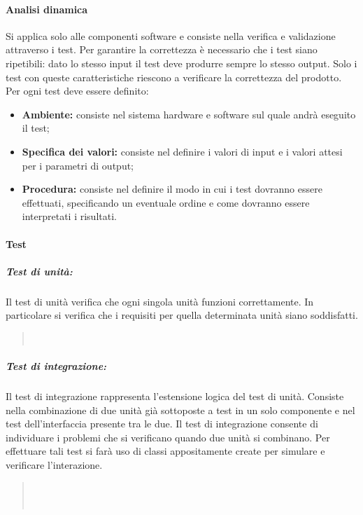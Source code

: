 	\paragraph{Analisi dinamica}
Si applica solo alle componenti software e consiste nella verifica e validazione attraverso i test. Per garantire la correttezza è necessario che i test siano ripetibili: dato lo stesso input il test deve produrre sempre lo stesso output. Solo i test con queste caratteristiche riescono a verificare la correttezza del prodotto.\\
Per ogni test deve essere definito:
\begin{itemize}
	\item \textbf{Ambiente: }consiste nel sistema hardware e software sul quale andrà eseguito il test;
	\item \textbf{Specifica dei valori: }consiste nel definire i valori di input e i valori attesi per i parametri di output;
	\item \textbf{Procedura: }consiste nel definire il modo in cui i test dovranno essere effettuati, specificando un eventuale ordine e come dovranno essere interpretati i risultati.  
\end{itemize}

	\paragraph{Test}
		\subparagraph{Test di unità:}
		Il test di unità verifica che ogni singola unità funzioni correttamente. In particolare si verifica che i requisiti per quella determinata unità siano soddisfatti.
		\begin{quote}
			\\
		\end{quote}
		
		\subparagraph{Test di integrazione:}
		Il test di integrazione rappresenta l'estensione logica del test di unità. Consiste nella combinazione di due unità già sottoposte a test in un solo componente e nel test dell'interfaccia presente tra le due. Il test di integrazione consente di individuare i problemi che si verificano quando due unità si combinano. Per effettuare tali test si farà uso di classi appositamente create per simulare e verificare l'interazione.
		\begin{quote}
			\\
			\\
		\end{quote}
	
